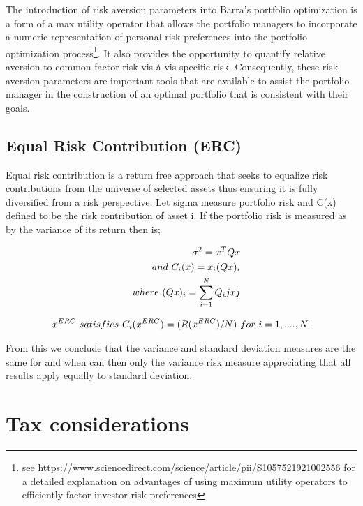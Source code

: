 \documentclass[11pt,preprint, authoryear]{elsarticle}
\numberwithin{equation}{section}
\numberwithin{figure}{section}
\numberwithin{table}{section}
\let\rmarkdownfootnote\footnote%
\def\footnote{\protect\rmarkdownfootnote}
\begin{document}
The introduction of risk aversion parameters into Barra's portfolio
optimization is a form of a max utility operator that allows the
portfolio managers to incorporate a numeric representation of personal
risk preferences into the portfolio optimization process\footnote{see
  \url{https://www.sciencedirect.com/science/article/pii/S1057521921002556}
  for a detailed explanation on advantages of using maximum utility
  operators to efficiently factor investor risk preferences}. It also
provides the opportunity to quantify relative aversion to common factor
risk vis-à-vis specific risk. Consequently, these risk aversion
parameters are important tools that are available to assist the
portfolio manager in the construction of an optimal portfolio that is
consistent with their goals.

\hypertarget{equal-risk-contribution-erc}{%
\subsection{Equal Risk Contribution
(ERC)}\label{equal-risk-contribution-erc}}

Equal risk contribution is a return free approach that seeks to equalize
risk contributions from the universe of selected assets thus ensuring it
is fully diversified from a risk perspective. Let sigma measure
portfolio risk and C(x) defined to be the risk contribution of asset i.
If the portfolio risk is measured as by the variance of its return then
is;

\begin{align}
\sigma^2 = x^TQ{x}\notag \\ and \ C_i(x)= x_i(Qx)_i \notag \\
\quad where\ (Qx)_i =\sum_{i = 1}^{N}Q_ijxj \notag
\end{align}

\begin{align}
x^{ERC} \ satisfies \ C_i(x^{ERC}) = (R(x^{ERC})/N) \ for \ i = 1,...., N. \notag
\end{align}

From this we conclude that the variance and standard deviation measures
are the same for and when can then only the variance risk measure
appreciating that all results apply equally to standard deviation.

\hypertarget{tax-considerations}{%
\section{Tax considerations}\label{tax-considerations}}
\end{document}

